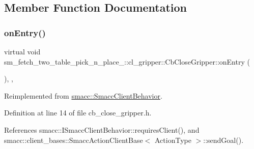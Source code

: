 \subsection{Member Function Documentation}
\mbox{\label{classsm__fetch__two__table__pick__n__place__1_1_1cl__gripper_1_1CbCloseGripper_a7f8673e6353c05f3d71225607b2e40bc}} 
\subsubsection{\texorpdfstring{on\+Entry()}{onEntry()}}
{\footnotesize\ttfamily virtual void sm\+\_\+fetch\+\_\+two\+\_\+table\+\_\+pick\+\_\+n\+\_\+place\+\_\+::cl\+\_\+gripper\+::\+Cb\+Close\+Gripper\+::on\+Entry (\begin{DoxyParamCaption}{ }\end{DoxyParamCaption})\hspace{0.3cm}{\ttfamily [inline]}, {\ttfamily [override]}, {\ttfamily [virtual]}}



Reimplemented from \hyperlink{classsmacc_1_1SmaccClientBehavior_ad5d3e1f1697c3cfe66c94cadba948493}{smacc\+::\+Smacc\+Client\+Behavior}.



Definition at line 14 of file cb\+\_\+close\+\_\+gripper.\+h.



References smacc\+::\+I\+Smacc\+Client\+Behavior\+::requires\+Client(), and smacc\+::client\+\_\+bases\+::\+Smacc\+Action\+Client\+Base$<$ Action\+Type $>$\+::send\+Goal().


